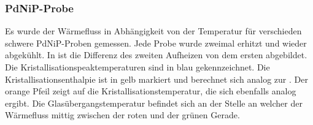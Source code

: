 \documentclass[
	a4paper,
	12pt,
	pagesize,
	ngerman
]{scrartcl}
\begin{document}
	\subsubsection*{PdNiP-Probe}
	Es wurde der Wärmefluss in Abhängigkeit von der Temperatur für verschieden schwere PdNiP-Proben gemessen.
	Jede Probe wurde zweimal erhitzt und wieder abgekühlt.
	In  ist die Differenz des zweiten Aufheizen von dem ersten abgebildet.
	Die Kristallisationspeaktemperaturen sind in blau gekennzeichnet.
	Die Kristallisationsenthalpie ist in gelb markiert und berechnet sich analog zur .
	Der orange Pfeil zeigt auf die Kristallisationstemperatur, die sich ebenfalls analog ergibt.
	Die Glasübergangstemperatur befindet sich an der Stelle an welcher der Wärmefluss mittig zwischen der roten und der grünen Gerade.
\end{document}
